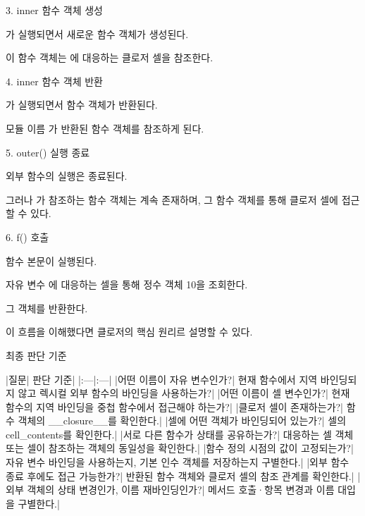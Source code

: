 \begin{dhknote}
\begin{dhksmry}[centered]
3. inner 함수 객체 생성
\end{dhksmry}
\end{dhknote}

가 실행되면서 새로운 함수 객체가 생성된다.

이 함수 객체는 에 대응하는 클로저 셀을 참조한다.

\begin{dhknote}
\begin{dhksmry}[centered]
4. inner 함수 객체 반환
\end{dhksmry}
\end{dhknote}

가 실행되면서 함수 객체가 반환된다.

모듈 이름 가 반환된 함수 객체를 참조하게 된다.

\begin{dhknote}
\begin{dhksmry}[centered]
5. outer() 실행 종료
\end{dhksmry}
\end{dhknote}

외부 함수의 실행은 종료된다.

그러나 가 참조하는 함수 객체는 계속 존재하며, 그 함수 객체를 통해 클로저 셀에 접근할 수 있다.

\begin{dhknote}
\begin{dhksmry}[centered]
6. f() 호출
\end{dhksmry}
\end{dhknote}

 함수 본문이 실행된다.

자유 변수 에 대응하는 셀을 통해 정수 객체 10을 조회한다.

그 객체를 반환한다.

이 흐름을 이해했다면 클로저의 핵심 원리르 설명할 수 있다.

\begin{dhknote}
\begin{dhksmry}[centered]
최종 판단 기준
\end{dhksmry}
\end{dhknote}

\begin{dhktable}
|질문|	판단 기준|
|:---|:---|
|어떤 이름이 자유 변수인가?|	현재 함수에서 지역 바인딩되지 않고 렉시컬 외부 함수의 바인딩을 사용하는가?|
|어떤 이름이 셀 변수인가?|	현재 함수의 지역 바인딩을 중첩 함수에서 접근해야 하는가?|
|클로저 셀이 존재하는가?|	함수 객체의 __closure__를 확인한다.|
|셀에 어떤 객체가 바인딩되어 있는가?|	셀의 cell_contents를 확인한다.|
|서로 다른 함수가 상태를 공유하는가?|	대응하는 셀 객체 또는 셀이 참조하는 객체의 동일성을 확인한다.|
|함수 정의 시점의 값이 고정되는가?|	자유 변수 바인딩을 사용하는지, 기본 인수 객체를 저장하는지 구별한다.|
|외부 함수 종료 후에도 접근 가능한가?|	반환된 함수 객체와 클로저 셀의 참조 관계를 확인한다.|
|외부 객체의 상태 변경인가, 이름 재바인딩인가?|	메서드 호출·항목 변경과 이름 대입을 구별한다.|
\end{dhktable}